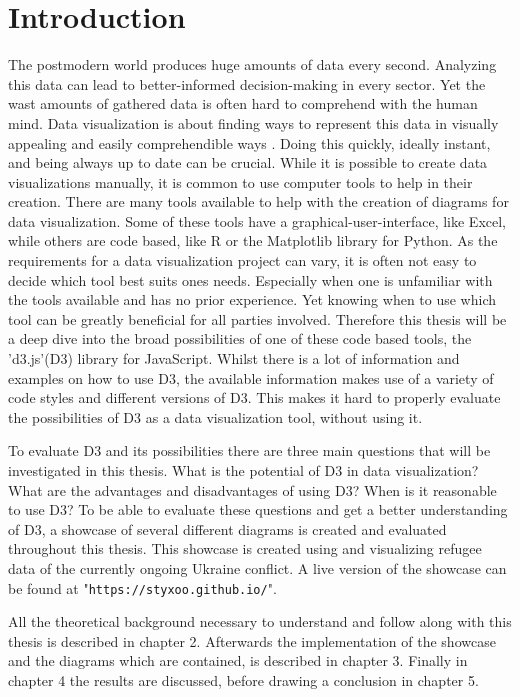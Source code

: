 \chapter{Introduction}


The postmodern world produces huge amounts of data every second. Analyzing this data can lead to better-informed decision-making in every sector. Yet the wast amounts of gathered data is often hard to comprehend with the human mind. Data visualization is about finding ways to represent this data in visually appealing and easily comprehendible ways \cite{sadiku2016data}. Doing this quickly, ideally instant, and being always up to date can be crucial. While it is possible to create data visualizations manually, it is common to use computer tools to help in their creation. There are many tools available to help with the creation of diagrams for data visualization. Some of these tools have a graphical-user-interface, like Excel\cite{excel}, while others are code based, like R\cite{r} or the Matplotlib\cite{matplotlib} library for Python. As the requirements for a data visualization project can vary, it is often not easy to decide which tool best suits ones needs. Especially when one is unfamiliar with the tools available and has no prior experience. Yet knowing when to use which tool can be greatly beneficial for all parties involved. Therefore this thesis will be a deep dive into the broad possibilities of one of these code based tools, the 'd3.js'(D3) library for JavaScript. Whilst there is a lot of information and examples on how to use D3, the available information makes use of a variety of code styles and different versions of D3. This makes it hard to properly evaluate the possibilities of D3 as a data visualization tool, without using it.

To evaluate D3 and its possibilities there are three main questions that will be investigated in this thesis. What is the potential of D3 in data visualization? What are the advantages and disadvantages of using D3? When is it reasonable to use D3? To be able to evaluate these questions and get a better understanding of D3, a showcase of several different diagrams is created and evaluated throughout this thesis. This showcase is created using and visualizing refugee data of the currently ongoing Ukraine conflict. A live version of the showcase can be found at "\texttt{https://styxoo.github.io/}".

All the theoretical background necessary to understand and follow along with this thesis is described in chapter 2. Afterwards the implementation of the showcase and the diagrams which are contained, is described in chapter 3. Finally in chapter 4 the results are discussed, before drawing a conclusion in chapter 5.
